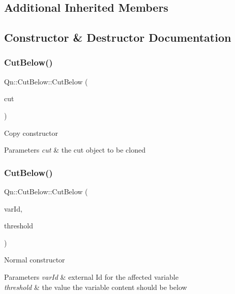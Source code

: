 \subsection*{Additional Inherited Members}


\subsection{Constructor \& Destructor Documentation}
\mbox{\label{classQn_1_1CutBelow_a68cce8c01e9c787e9f7fb1fcd90e9eca}} 
\subsubsection{\texorpdfstring{Cut\+Below()}{CutBelow()}\hspace{0.1cm}{\footnotesize\ttfamily [1/2]}}
{\footnotesize\ttfamily Qn\+::\+Cut\+Below\+::\+Cut\+Below (\begin{DoxyParamCaption}\item[{const \mbox{\hyperlink{classQn_1_1CutBelow}{Cut\+Below}} \&}]{cut }\end{DoxyParamCaption})}

Copy constructor 
\begin{DoxyParams}{Parameters}
{\em cut} & the cut object to be cloned \\
\hline
\end{DoxyParams}
\mbox{\label{classQn_1_1CutBelow_a62dec52f3fc28e603ee8e355c4885c6b}} 
\subsubsection{\texorpdfstring{Cut\+Below()}{CutBelow()}\hspace{0.1cm}{\footnotesize\ttfamily [2/2]}}
{\footnotesize\ttfamily Qn\+::\+Cut\+Below\+::\+Cut\+Below (\begin{DoxyParamCaption}\item[{Int\+\_\+t}]{var\+Id,  }\item[{Float\+\_\+t}]{threshold }\end{DoxyParamCaption})}

Normal constructor 
\begin{DoxyParams}{Parameters}
{\em var\+Id} & external Id for the affected variable \\
\hline
{\em threshold} & the value the variable content should be below \\
\hline
\end{DoxyParams}


